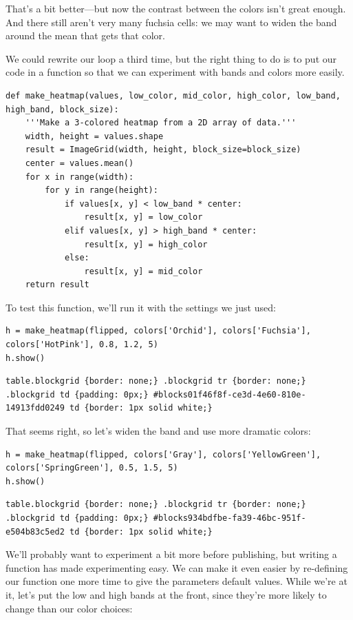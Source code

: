 \documentclass{book}
\begin{document}
That's a bit better---but now the contrast between the colors isn't
great enough. And there still aren't very many fuchsia cells: we may
want to widen the band around the mean that gets that color.

We could rewrite our loop a third time, but the right thing to do is to
put our code in a function so that we can experiment with bands and
colors more easily.

\begin{verbatim}
def make_heatmap(values, low_color, mid_color, high_color, low_band, high_band, block_size):
    '''Make a 3-colored heatmap from a 2D array of data.'''
    width, height = values.shape
    result = ImageGrid(width, height, block_size=block_size)
    center = values.mean()
    for x in range(width):
        for y in range(height):
            if values[x, y] < low_band * center:
                result[x, y] = low_color
            elif values[x, y] > high_band * center:
                result[x, y] = high_color
            else:
                result[x, y] = mid_color
    return result
\end{verbatim}

To test this function, we'll run it with the settings we just used:

\begin{verbatim}
h = make_heatmap(flipped, colors['Orchid'], colors['Fuchsia'], colors['HotPink'], 0.8, 1.2, 5)
h.show()
\end{verbatim}

\begin{verbatim}
table.blockgrid {border: none;} .blockgrid tr {border: none;} .blockgrid td {padding: 0px;} #blocks01f46f8f-ce3d-4e60-810e-14913fdd0249 td {border: 1px solid white;}
\end{verbatim}

That seems right, so let's widen the band and use more dramatic colors:

\begin{verbatim}
h = make_heatmap(flipped, colors['Gray'], colors['YellowGreen'], colors['SpringGreen'], 0.5, 1.5, 5)
h.show()
\end{verbatim}

\begin{verbatim}
table.blockgrid {border: none;} .blockgrid tr {border: none;} .blockgrid td {padding: 0px;} #blocks934bdfbe-fa39-46bc-951f-e504b83c5ed2 td {border: 1px solid white;}
\end{verbatim}

We'll probably want to experiment a bit more before publishing, but
writing a function has made experimenting easy. We can make it even
easier by re-defining our function one more time to give the parameters
default values. While we're at it, let's put the low and high bands at
the front, since they're more likely to change than our color choices:
\end{document}
